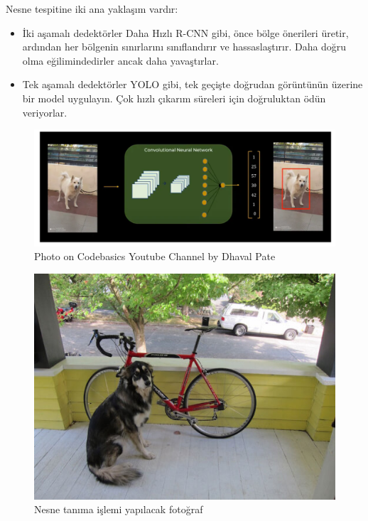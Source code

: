 \documentclass[11pt,a4paper]{report}
\begin{document}
    Nesne tespitine iki ana yaklaşım vardır:
    \begin{itemize}
    	\item  İki aşamalı dedektörler Daha Hızlı R-CNN gibi, önce bölge önerileri üretir, ardından her bölgenin sınırlarını sınıflandırır ve hassaslaştırır. Daha doğru olma eğilimindedirler ancak daha yavaştırlar.
    	\item  Tek aşamalı dedektörler YOLO gibi, tek geçişte doğrudan görüntünün üzerine bir model uygulayın. Çok hızlı çıkarım süreleri için doğruluktan ödün veriyorlar.
    \end{itemize}
    
    \begin{figure}[!h]
    	\centering
    	\includegraphics[width=\textwidth]{yolo}
    	\caption{Photo on Codebasics Youtube Channel by Dhaval Pate}
    	\label{fig:ornek2}
    \end{figure}
    \newpage
    
    \begin{figure}[!h]
    	\centering
    	\includegraphics[width=\textwidth]{nesnetanıma1}
    	\caption{Nesne tanıma işlemi yapılacak fotoğraf}
    	\label{fig:ornek3}
    \end{figure}
    
\end{document}
